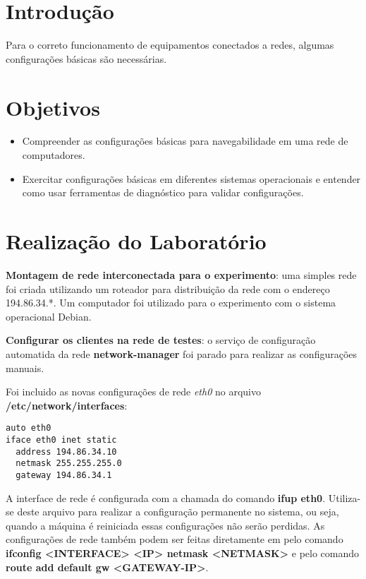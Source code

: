 \section{Introdução}

Para o correto funcionamento de equipamentos conectados a redes, algumas
configurações básicas são necessárias.

\section{Objetivos}

\begin{itemize}
  \item Compreender as configurações básicas para navegabilidade em uma
    rede de computadores.
  \item Exercitar configurações básicas em diferentes sistemas operacionais
    e entender como usar ferramentas de diagnóstico para validar configurações.
\end{itemize}

\section{Realização do Laboratório}

\textbf{Montagem de rede interconectada para o experimento}: uma simples rede
foi criada utilizando um roteador para distribuição da rede com o endereço
194.86.34.*. Um computador foi utilizado para o experimento com o sistema
operacional Debian.

\textbf{Configurar os clientes na rede de testes}: o serviço de configuração
automatida da rede \textbf{network-manager} foi parado para realizar as
configurações manuais.

Foi incluido as novas configurações de rede \textit{eth0} no arquivo \textbf{/etc/network/interfaces}:

\lstset{style=basic}
\begin{lstlisting}
auto eth0
iface eth0 inet static
  address 194.86.34.10
  netmask 255.255.255.0
  gateway 194.86.34.1
\end{lstlisting}

A interface de rede é configurada com a chamada do comando \textbf{ifup eth0}.
Utiliza-se deste arquivo para realizar a configuração permanente no sistema,
ou seja, quando a máquina é reiniciada essas configurações não serão perdidas.
As configurações de rede também podem ser feitas diretamente em pelo comando
\textbf{ifconfig <INTERFACE> <IP> netmask <NETMASK>} e pelo comando
\textbf{route add default gw <GATEWAY-IP>}.

